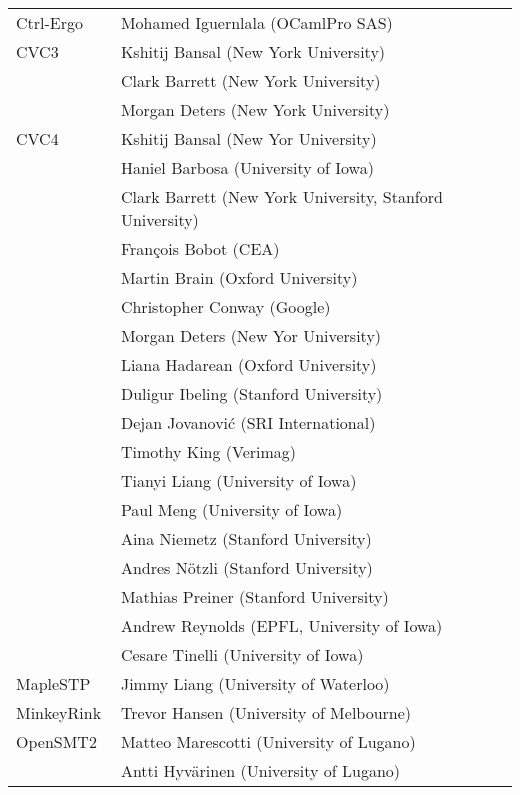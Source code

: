 \begin{longtable}{lp{11.5cm}}
  Ctrl-Ergo~\cite{10.1007/978-3-642-31365-3_8}
  & Mohamed Iguernlala (OCamlPro SAS)
  \\[1ex]

  CVC3~\cite{DBLP:conf/cav/BarrettT07}
  & Kshitij Bansal (New York University) \\
  & Clark Barrett (New York University) \\
  & Morgan Deters (New York University)
  \\[1ex]

  CVC4~\cite{DBLP:conf/cav/BarrettCDHJKRT11}
  & Kshitij Bansal (New Yor University) \\
  & Haniel Barbosa (University of Iowa) \\
  & Clark Barrett (New York University, Stanford University) \\
  & Fran\c{c}ois Bobot (CEA) \\
  & Martin Brain (Oxford University) \\
  & Christopher Conway (Google) \\
  & Morgan Deters (New Yor University) \\
  & Liana Hadarean (Oxford University) \\
  & Duligur Ibeling (Stanford University) \\
  & Dejan Jovanovi\'c (SRI International) \\
  & Timothy King (Verimag) \\
  & Tianyi Liang (University of Iowa) \\
  & Paul Meng (University of Iowa) \\
  & Aina Niemetz (Stanford University) \\
  & Andres N\"otzli (Stanford University) \\
  & Mathias Preiner (Stanford University) \\
  & Andrew Reynolds (EPFL, University of Iowa) \\
  & Cesare Tinelli (University of Iowa)
  \\[1ex]

  MapleSTP
  & Jimmy Liang (University of Waterloo)
  \\[1ex]

  MinkeyRink
  & Trevor Hansen (University of Melbourne)
  \\[1ex]

  OpenSMT2~\cite{DBLP:conf/sat/HyvarinenMAS16}
  & Matteo Marescotti (University of Lugano) \\
  & Antti Hyv\"arinen (University of Lugano)
  \\[1ex]


\end{longtable}
